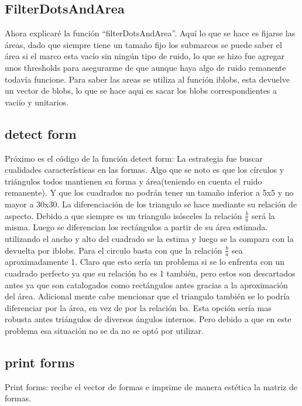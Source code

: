 \subsection{FilterDotsAndArea}
Ahora explicar\'e la función ``filterDotsAndArea''.
Aqu\'i lo que se hace es fijarse las áreas, dado que siempre tiene un tamaño fijo los submarcos se puede saber el área si el marco esta vacío sin ningún tipo de ruido, lo que se hizo fue agregar unos thresholds para asegurarme de que aunque haya algo de ruido remanente todavía funcione. Para saber las areas se utiliza al función iblobs, esta devuelve un vector de blobs, lo que se hace aqui es sacar los blobs correspondientes a vaci\'io y unitarios.

\subsection{detect form}
Pr\'oximo es el código de la función detect form:
La estrategia fue buscar cualidades características en las formas. Algo que se noto es que los círculos y triángulos todos mantienen su forma y \'area(teniendo en cuenta el ruido remanente). Y que los cuadrados no podr\'an tener un tamaño inferior a 5x5 y no mayor a 30x30.
La diferenciaci\'on de los triangulo se hace mediante su relación de aspecto. Debido a que siempre es un triangulo isósceles la relaci\'on $\frac{b}{a}$ ser\'a la misma. Luego se diferencian los rectángulos a partir de su área estimada. utilizando el ancho y alto del cuadrado se la estima y luego se la compara con la devuelta por iblobs. Para el circulo basta con que la relaci\'on $\frac{b}{a}$ sea aproximadamente 1.
Claro que esto ser\'ia un problema si se lo enfrenta con un cuadrado perfecto ya que su relación ba es 1 tambi\'en, pero estos son descartados antes ya que son catalogados como rectángulos antes gracias a la aproximaci\'on del \'area. Adicional mente cabe mencionar que el triangulo tambi\'en se lo podr\'ia diferenciar por la área, en vez de por la relaci\'on ba. Esta opción ser\'ia mas robusta antes triángulos de diversos ángulos internos. Pero debido a que en este problema esa situaci\'on no se da no se opt\'o por utilizar.

\subsection{print forms}
Print forms: recibe el vector de formas e imprime de manera estética la matriz de formas.

